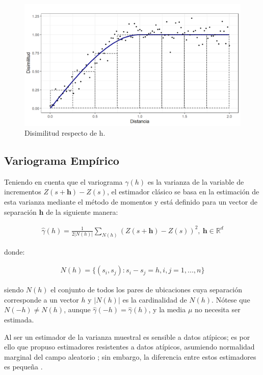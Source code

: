 \documentclass[
]{book}
\begin{document}
\begin{figure}
\includegraphics[width=17.78in]{figuras/otros/var_cloud} \caption{Disimilitud respecto de h.}\label{fig:varcloud}
\end{figure}

\hypertarget{variograma-empuxedrico}{%
\subsection{Variograma Empírico}\label{variograma-empuxedrico}}

Teniendo en cuenta que el variograma \(\gamma(h)\) es la varianza de la variable de incrementos \(Z(s+\textbf{h})-Z(s)\), el estimador clásico se basa en la estimación de esta varianza mediante el método de momentos y está definido para un vector de separación \(\textbf{h}\) de la siguiente manera:

\begin{align*}
  \hat{\gamma}(h)=\frac{1}{2|N(h)|}\sum_{N(h)}(Z(s+\textbf{h})-Z(s))^2, \ \textbf{h}\in \mathbb{R}^d  
\end{align*}

donde:

\begin{align*}
  N(h)=\{(s_i,s_j):s_i-s_j=h, i,j=1,...,n\}  
\end{align*}

siendo \(N(h)\) el conjunto de todos los pares de ubicaciones cuya separación corresponde a un vector \(h\) y \(|N(h)|\) es la cardinalidad de \(N(h)\). Nótese que \(N(-h)\neq N(h)\), aunque \(\hat{\gamma}(-h)=\hat{\gamma}(h)\), y la media \(\mu\) no necesita ser estimada.

Al ser un estimador de la varianza muestral es sensible a datos atípicos; es por ello que \citep{Cressi} propuso estimadores resistentes a datos atípicos, asumiendo normalidad marginal del campo aleatorio \citep{marta}; sin embargo, la diferencia entre estos estimadores es pequeña \citep{Cressi}.
\end{document}
